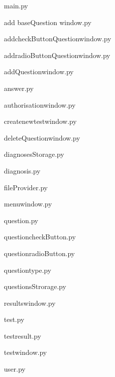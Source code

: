main.py


add baseQuestion window.py


addcheckButtonQuestionwindow.py


addradioButtonQuestionwindow.py


addQuestionwindow.py


answer.py


authorisationwindow.py


createnewtestwindow.py


deleteQuestionwindow.py


diagnosesStorage.py


diagnosis.py


fileProvider.py


menuwindow.py


question.py


questioncheckButton.py


questionradioButton.py


questiontype.py


questionsStrorage.py


resultswindow.py


test.py


testresult.py


testwindow.py


user.py


\fi
